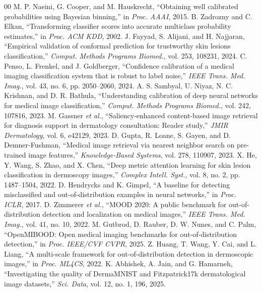 \documentclass[conference]{IEEEtran}
\begin{document}
\begin{thebibliography}{00}
 M. P. Naeini, G. Cooper, and M. Hauskrecht, ``Obtaining well calibrated probabilities using Bayesian binning,'' in \emph{Proc. AAAI}, 2015.
 B. Zadrozny and C. Elkan, ``Transforming classifier scores into accurate multiclass probability estimates,'' in \emph{Proc. ACM KDD}, 2002.
 J. Fayyad, S. Alijani, and H. Najjaran, ``Empirical validation of conformal prediction for trustworthy skin lesions classification,'' \emph{Comput. Methods Programs Biomed.}, vol. 253, 108231, 2024.
 C. Penso, L. Frenkel, and J. Goldberger, ``Confidence calibration of a medical imaging classification system that is robust to label noise,'' \emph{IEEE Trans. Med. Imag.}, vol. 43, no. 6, pp. 2050--2060, 2024.
 A. S. Sambyal, U. Niyaz, N. C. Krishnan, and D. R. Bathula, ``Understanding calibration of deep neural networks for medical image classification,'' \emph{Comput. Methods Programs Biomed.}, vol. 242, 107816, 2023.
 M. Gassner \emph{et al.}, ``Saliency-enhanced content-based image retrieval for diagnosis support in dermatology consultation: Reader study,'' \emph{JMIR Dermatology}, vol. 6, e42129, 2023.
 D. Gupta, R. Loane, S. Gayen, and D. Demner-Fushman, ``Medical image retrieval via nearest neighbor search on pre-trained image features,'' \emph{Knowledge-Based Systems}, vol. 278, 110907, 2023.
 X. He, Y. Wang, S. Zhao, and X. Chen, ``Deep metric attention learning for skin lesion classification in dermoscopy images,'' \emph{Complex Intell. Syst.}, vol. 8, no. 2, pp. 1487--1504, 2022.
 D. Hendrycks and K. Gimpel, ``A baseline for detecting misclassified and out-of-distribution examples in neural networks,'' in \emph{Proc. ICLR}, 2017.
 D. Zimmerer \emph{et al.}, ``MOOD 2020: A public benchmark for out-of-distribution detection and localization on medical images,'' \emph{IEEE Trans. Med. Imag.}, vol. 41, no. 10, 2022.
 M. Gutbrod, D. Rauber, D. W. Nunes, and C. Palm, ``OpenMIBOOD: Open medical imaging benchmarks for out-of-distribution detection,'' in \emph{Proc. IEEE/CVF CVPR}, 2025.
 Z. Huang, T. Wang, Y. Cai, and L. Liang, ``A multi-scale framework for out-of-distribution detection in dermoscopic images,'' in \emph{Proc. ML4CS}, 2022.
 K. Abhishek, A. Jain, and G. Hamarneh, ``Investigating the quality of DermaMNIST and Fitzpatrick17k dermatological image datasets,'' \emph{Sci. Data}, vol. 12, no. 1, 196, 2025.

\end{thebibliography}
\end{document}
